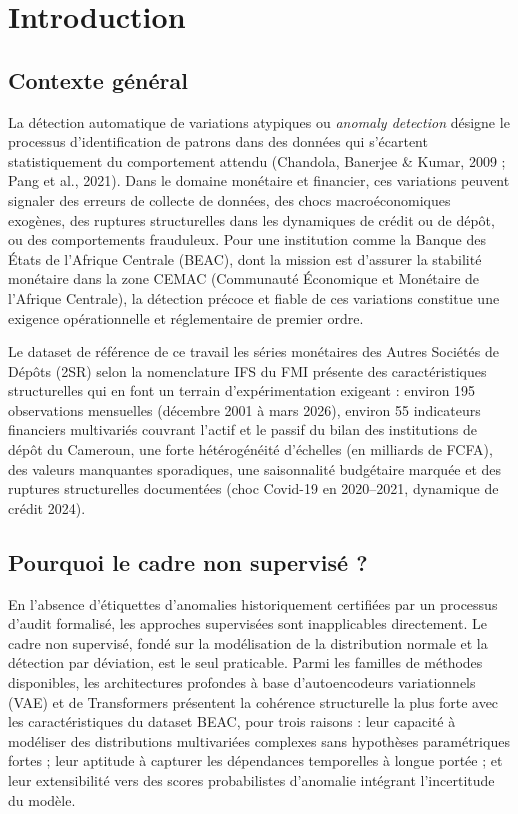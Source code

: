 \documentclass[12pt,a4paper]{article}
\begin{document}
\tableofcontents
\newpage

\section{Introduction}

\subsection{Contexte général}

La détection automatique de variations atypiques  ou \textit{anomaly detection}  désigne le processus d'identification de patrons dans des données qui s'écartent statistiquement du comportement attendu (Chandola, Banerjee \& Kumar, 2009 ; Pang et al., 2021). Dans le domaine monétaire et financier, ces variations peuvent signaler des erreurs de collecte de données, des chocs macroéconomiques exogènes, des ruptures structurelles dans les dynamiques de crédit ou de dépôt, ou des comportements frauduleux. Pour une institution comme la Banque des États de l'Afrique Centrale (BEAC), dont la mission est d'assurer la stabilité monétaire dans la zone CEMAC (Communauté Économique et Monétaire de l'Afrique Centrale), la détection précoce et fiable de ces variations constitue une exigence opérationnelle et réglementaire de premier ordre.

Le dataset de référence de ce travail  les séries monétaires des Autres Sociétés de Dépôts (2SR) selon la nomenclature IFS du FMI  présente des caractéristiques structurelles qui en font un terrain d'expérimentation exigeant : environ 195 observations mensuelles (décembre 2001 à mars 2026), environ 55 indicateurs financiers multivariés couvrant l'actif et le passif du bilan des institutions de dépôt du Cameroun, une forte hétérogénéité d'échelles (en milliards de FCFA), des valeurs manquantes sporadiques, une saisonnalité budgétaire marquée et des ruptures structurelles documentées (choc Covid-19 en 2020--2021, dynamique de crédit 2024).

\subsection{Pourquoi le cadre non supervisé ?}

En l'absence d'étiquettes d'anomalies historiquement certifiées par un processus d'audit formalisé, les approches supervisées sont inapplicables directement. Le cadre non supervisé, fondé sur la modélisation de la distribution normale et la détection par déviation, est le seul praticable. Parmi les familles de méthodes disponibles, les architectures profondes à base d'autoencodeurs variationnels (VAE) et de Transformers présentent la cohérence structurelle la plus forte avec les caractéristiques du dataset BEAC, pour trois raisons : leur capacité à modéliser des distributions multivariées complexes sans hypothèses paramétriques fortes ; leur aptitude à capturer les dépendances temporelles à longue portée ; et leur extensibilité vers des scores probabilistes d'anomalie intégrant l'incertitude du modèle.
\end{document}

